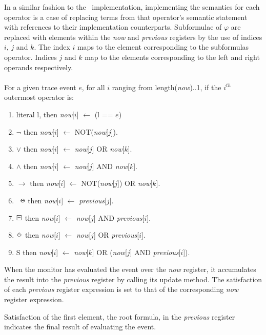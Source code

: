 In a similar fashion to the \RH\ implementation, implementing the semantics for each operator is a case of replacing terms from that operator's semantic statement with references to their implementation counterparts.  Subformulae of $\varphi$ are replaced with elements within the \textit{now} and \textit{previous} registers by the use of indices $i$, $j$ and $k$.  The index $i$ maps to the element corresponding to the subformulas operator.  Indices $j$ and $k$ map to the elements corresponding to the left and right operands respectively.\\
\\
For a given trace event $e$, for all $i$ ranging from length(\textit{now})..1, if the $i^{th}$ outermost operator is:

\begin{enumerate}
\item literal l, then \textit{now}[$i$] $\leftarrow$ (l == $e$)
\item $ \neg $ then \textit{now}[$i$] $ \leftarrow $ NOT(\textit{now}[$j$]).
\item $ \lor $ then \textit{now}[$i$] $ \leftarrow $ \textit{now}[$j$] OR \textit{now}[$k$]. 
\item $ \land $ then \textit{now}[$i$] $ \leftarrow $ \textit{now}[$j$] AND \textit{now}[$k$]. 
\item $ \rightarrow $ then \textit{now}[$i$] $ \leftarrow $ NOT(\textit{now}[$j$]) OR \textit{now}[$k$]. 
\item $ \LTLprevious $ then \textit{now}[$i$] $ \leftarrow $ \textit{previous}[$j$].
\item $ \LTLalwaysbeen $ then \textit{now}[$i$] $ \leftarrow $ \textit{now}[$j$] AND \textit{previous}[$i$].
\item $ \LTLonce $ then \textit{now}[$i$] $ \leftarrow $ \textit{now}[$j$] OR \textit{previous}[$i$].
\item S then \textit{now}[$i$] $ \leftarrow $ \textit{now}[$k$] OR (\textit{now}[$j$] AND \textit{previous}[$i$]).
\end{enumerate}

When the monitor has evaluated the event over the \textit{now} register, it accumulates the result into the \textit{previous} register by calling its update method.  The satisfaction of each \textit{previous} register expression is set to that of the corresponding \textit{now} register expression.

Satisfaction of the first element, the root formula, in the \textit{previous} register indicates the final result of evaluating the event.

